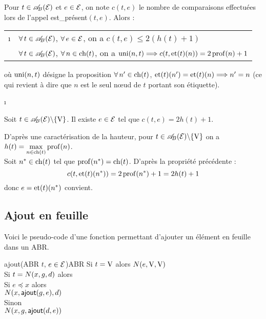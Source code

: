 		\begin{Propriete}
			Pour \(t\in\ABE\) et \(e\in\cal{E}\), on note \(c(t,e)\) le nombre de comparaisons effectuées lors de l'appel \textsf{est\_présent}\((t,e)\). Alors : \nt
				\begin{tabular}[h]{cl}
					\i & \(\forall\,t\in\ABE\), \(\forall\,e\in\cal{E}\), on a \(c(t,e) \leq 2(h(t)+1)\) \\
					\ii & \(\forall\,t\in\ABE\), \(\forall\,n\in\ch(t)\), on a \(\uni(n,t) \Longrightarrow c(t,\et(t)(n)) = 2\prof(n) + 1\)
				\end{tabular} \nt
			où \(\uni(n,t)\) désigne la proposition \(\forall\,n'\in\ch(t)\), \(\et(t)(n') = \et(t)(n) \Longrightarrow n' = n\) (ce qui revient à dire que \(n\) est le seul n\oe ud de \(t\) portant son étiquette).
		\end{Propriete}
		
		\begin{Preuve}
			\i
		\end{Preuve}
	
		\begin{Corollaire}
			Soit \(t\in\ABE\backslash\{\V\}\). Il existe \(e\in\cal{E}\) tel que \(c(t,e) = 2h(t) + 1\).
		\end{Corollaire}
		
		\eqskip{2mm}
		\begin{Preuve}
			D'après une caractérisation de la hauteur, pour \(t\in\ABE\backslash\{\V\}\) on a \(h(t) = \displaystyle \max_{n\in\ch(t)} \prof(n)\).\\[-2mm]
			Soit \(n^*\in\ch(t)\) tel que \(\prof(n^*) = \ch(t)\). D'après la propriété précédente :
				\[c(t,\et(t)(n^*)) = 2\prof(n^*) + 1 = 2h(t)+1\] donc \(e = \et(t)(n^*)\) convient.
		\end{Preuve}
	
	\subsection{Ajout en feuille}
	
		Voici le pseudo-code d'une fonction permettant d'ajouter un élément en feuille dans un ABR.
		
		\pagebreak		
		\begin{pscode}{ajout}{(ABR \(t\), \(e\in\cal{E}\))}{ABR}{}
			Si \(t = \V\) alors \(\N(e,\V,\V)\) \\
			Si \(t = \N(x,g,d)\) alors \\ \Indp
				Si \(e \preccurlyeq x\) alors \\ \Indp
					\(\N(x,\text{\textsf{ajout}}(g,e),d)\) \\ \Indm
				Sinon \\ \Indp
					\(\N(x,g,\text{\textsf{ajout}}(d,e))\)
		\end{pscode}
	
